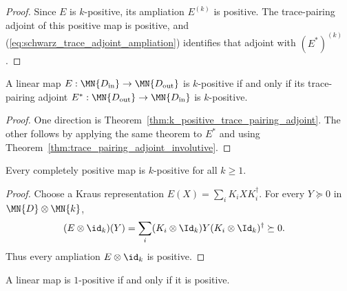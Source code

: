 \begin{proof}
    \leanok
    Since $E$ is $k$-positive, its ampliation $E^{(k)}$ is positive. The
    trace-pairing adjoint of this positive map is positive, and
    (\ref{eq:schwarz_trace_adjoint_ampliation}) identifies that adjoint with
    $(E^*)^{(k)}$.
\end{proof}

\begin{theorem}
    \label{thm:k_positive_trace_pairing_adjoint_iff}
    \leanok
    A linear map $E:\MN{D_{\rm in}}\to\MN{D_{\rm out}}$ is $k$-positive
    if and only if its trace-pairing adjoint
    $E^*:\MN{D_{\rm out}}\to\MN{D_{\rm in}}$ is $k$-positive.
\end{theorem}

\begin{proof}
    \leanok
    One direction is
    Theorem~\ref{thm:k_positive_trace_pairing_adjoint}. The other follows by
    applying the same theorem to $E^*$ and using
    Theorem~\ref{thm:trace_pairing_adjoint_involutive}.
\end{proof}

\begin{theorem}
    \label{thm:cp_implies_k_positive}
    \leanok
    Every completely positive map is $k$-positive for all $k \ge 1$.
\end{theorem}

\begin{proof}
    \leanok
    Choose a Kraus representation $E(X)=\sum_i K_iXK_i^\dagger$. For every
    $Y\succeq0$ in $\MN{D}\otimes\MN{k}$,
    \begin{align}
        (E\otimes\id_k)(Y)
         & =\sum_i (K_i\otimes\Id_k)Y(K_i\otimes\Id_k)^\dagger
        \succeq0.
        \notag
    \end{align}
    Thus every ampliation $E\otimes\id_k$ is positive.
\end{proof}

\begin{theorem}
    \label{thm:one_positive_iff_positive}
    \leanok
    A linear map is $1$-positive if and only if it is positive.
\end{theorem}

